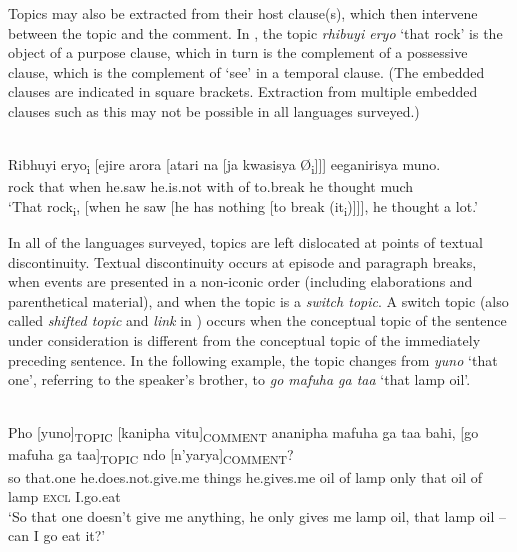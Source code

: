 \documentclass[output=paper]{langsci/langscibook}
\begin{document}
Topics may also be extracted from their host clause(s), which then intervene between the topic and the comment. In , the topic \textit{rhibuyi eryo} ‘that rock’ is the object of a purpose clause, which in turn is the complement of a possessive clause, which is the complement of ‘see’ in a temporal clause. (The embedded clauses are indicated in square brackets. Extraction from multiple embedded clauses such as this may not be possible in all languages surveyed.)

\ea\label{ex:6.nicolle}
\\
\gll Ribhuyi eryo\textsubscript{i} [ejire arora [atari na [ja kwasisya Ø\textsubscript{i}]]] eeganirisya muno.\\
rock that {\db}when he.saw he.is.not with {\db}of to.break he thought much\\
\glt ‘\textup{That rock}\textsubscript{i}\textup{, [when he saw [he has nothing [to break (it}\textsubscript{i}\textup{)]]], he thought a}\textup{ lot.’}
\z

In all of the languages surveyed, topics are left dislocated at points of textual discontinuity. Textual discontinuity occurs at episode and paragraph breaks, when events are presented in a non-iconic order (including elaborations and parenthetical material), and when the topic is a \textit{switch topic}. A switch topic (also called \textit{shifted topic} and \textit{link} in \citealt[109--110]{vallduvi1992}) occurs when the conceptual topic of the sentence under consideration is different from the conceptual topic of the immediately preceding sentence. In the following example, the topic changes from \textit{yuno} ‘that one’, referring to the speaker’s brother, to \textit{go mafuha ga taa} ‘that lamp oil’.

\ea\label{ex:7.nicolle}
\\
\gll Pho [yuno]\textsubscript{TOPIC} [kanipha vitu]\textsubscript{COMMENT} ananipha mafuha ga taa bahi, [go mafuha ga taa]\textsubscript{TOPIC} ndo [n’yarya]\textsubscript{COMMENT}?\\
so {\db}that.one {\db}he.does.not.give.me things he.gives.me oil of lamp only {\db}that oil of lamp \textsc{excl} {\db}I.go.eat\\
\glt \textup{‘So t}\textup{hat one doesn’t give me anything, he only gives me lamp oil, that lamp oil -- can I g}\textup{o eat it?’}
\z
\end{document}
